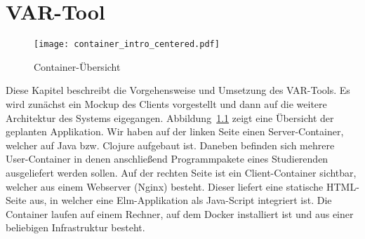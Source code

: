\chapter{VAR-Tool}
\label{ch:main-matter}
  \begin{figure}[H]
    \centering
    \texttt{[image: container\_intro\_centered.pdf]}
    \par
    \caption{Container-Übersicht}
    \label{fig:container-intro}
  \end{figure}
  Diese Kapitel beschreibt die Vorgehensweise und Umsetzung des VAR-Tools.
  Es wird zunächst ein Mockup des Clients vorgestellt und dann auf die weitere Architektur des Systems eigegangen.
  Abbildung~\ref{fig:container-intro} zeigt eine Übersicht der geplanten Applikation.
  Wir haben auf der linken Seite einen Server-Container, welcher auf Java bzw. Clojure aufgebaut ist.
  Daneben befinden sich mehrere User-Container in denen anschließend Programmpakete eines Studierenden ausgeliefert werden sollen.
  Auf der rechten Seite ist ein Client-Container sichtbar, welcher aus einem Webserver (Nginx) besteht.
  Dieser liefert eine statische HTML-Seite aus, in welcher eine Elm-Applikation als Java-Script integriert ist.
  Die Container laufen auf einem Rechner, auf dem Docker installiert ist und aus einer beliebigen Infrastruktur besteht.
  \clearpage


